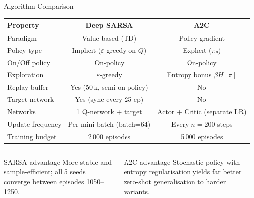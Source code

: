 \documentclass[aspectratio=169, 10pt]{beamer}
\begin{document}
\begin{frame}{Algorithm Comparison}
  \begin{center}
  \renewcommand{\arraystretch}{1.35}
  \begin{tabular}{lcc}
    \toprule
    \textbf{Property} & \textbf{Deep SARSA} & \textbf{A2C} \\
    \midrule
    Paradigm          & Value-based (TD)   & Policy gradient \\
    Policy type       & Implicit ($\varepsilon$-greedy on $Q$) & Explicit ($\pi_\theta$) \\
    On/Off policy     & On-policy          & On-policy \\
    Exploration       & $\varepsilon$-greedy & Entropy bonus $\beta H[\pi]$ \\
    Replay buffer     & Yes (50\,k, semi-on-policy) & No \\
    Target network    & Yes (sync every 25 ep) & No \\
    Networks          & 1 Q-network + target & Actor + Critic (separate LR) \\
    Update frequency  & Per mini-batch (batch=64) & Every $n=200$ steps \\
    Training budget   & 2\,000 episodes    & 5\,000 episodes \\
    \bottomrule
  \end{tabular}
  \end{center}
  \vspace{0.3em}
  \begin{columns}
      \begin{block}{\color{white}SARSA advantage}
        More stable and sample-efficient; all 5 seeds converge
        between episodes 1050--1250.
      \end{block}
      \begin{block}{\color{white}A2C advantage}
        Stochastic policy with entropy regularisation yields
        far better zero-shot generalisation to harder variants.
      \end{block}
  \end{columns}
\end{frame}
\end{document}
